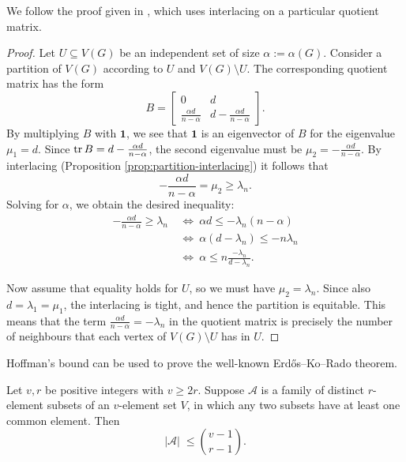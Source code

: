 We follow the proof given in \cite[Theorem 3.5.2]{brouwerhaemers}, which uses interlacing on a particular quotient matrix.
\begin{proof}
    Let $U \subseteq V(G)$ be an independent set of size $\alpha := \alpha(G)$.
    Consider a partition of $V(G)$ according to $U$ and $V(G) \setminus U$.
    The corresponding quotient matrix has the form
    \begin{equation*}
        B = \begin{bmatrix}
            0 & d \\ 
            \frac{\alpha d}{n - \alpha} & d - \frac{\alpha d}{n - \alpha}
        \end{bmatrix}.
    \end{equation*}
    By multiplying $B$ with $\bm{1}$, we see that $\bm{1}$ is an eigenvector of $B$ for the eigenvalue $\mu_1 = d$.
    Since $\operatorname{tr} B = d - \frac{\alpha d}{n - \alpha}$, the second eigenvalue must be $\mu_2 = -\frac{\alpha d}{n - \alpha}$.
    By interlacing (Proposition \ref{prop:partition-interlacing}) it follows that 
    \begin{equation*}
        -\frac{\alpha d}{n - \alpha} = \mu_2 \ge \lambda_n.
    \end{equation*}
    Solving for $\alpha$, we obtain the desired inequality:
    \begin{align*}
        -\frac{\alpha d}{n - \alpha} \ge \lambda_n \ &\Longleftrightarrow \ \alpha d \le -\lambda_n (n - \alpha)\\ 
            &\Longleftrightarrow \ \alpha (d - \lambda_n) \le -n \lambda_n \\ 
            &\Longleftrightarrow \ \alpha \le n \frac{- \lambda_n}{d - \lambda_n}.
    \end{align*}

    Now assume that equality holds for $U$, so we must have $\mu_2 = \lambda_n$.
    Since also $d = \lambda_1 = \mu_1$, the interlacing is tight, and hence the partition is equitable. 
    This means that the term $\frac{\alpha d}{n - \alpha} = -\lambda_n$ in the quotient matrix is precisely the number of neighbours that each vertex of $V(G) \setminus U$ has in $U$.
\end{proof}

Hoffman's bound can be used to prove the well-known Erd\H os--Ko--Rado theorem.

\begin{theorem}
    \label{thm:erdoskorado}
    Let $v, r$ be positive integers with $v \ge 2r$.
    Suppose $\mathcal A$ is a family of distinct $r$-element subsets of an $v$-element set $V$, in which any two subsets have at least one common element.
    Then
    \begin{equation*}
        |\mathcal A |\;\le \binom{v - 1}{r - 1}.
    \end{equation*}
\end{theorem}

